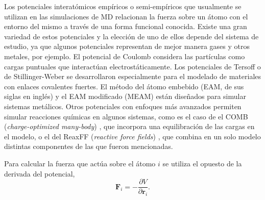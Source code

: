 Los potenciales interatómicos empíricos o semi-empíricos que usualmente se 
utilizan en las simulaciones de MD relacionan la fuerza sobre un átomo con el 
entorno del mismo a través de una forma funcional conocida. Existe una gran 
variedad de estos potenciales y la elección de uno de ellos depende del sistema 
de estudio, ya que algunos potenciales representan de mejor manera gases y otros 
metales, por ejemplo. El potencial de Coulomb \cite{coulomb} considera las 
partículas como cargas puntuales que interactúan electrostáticamente. Los 
potenciales de Tersoff \cite{tersoff} o de Stillinger-Weber 
\cite{stillinger-weber} se desarrollaron especialmente para el modelado de 
materiales con enlaces covalentes fuertes.%
El método del átomo embebido (EAM, de sus siglas en inglés) \cite{eam} 
y el EAM modificado (MEAM) \cite{meam} están diseñados para simular sistemas 
metálicos. Otros potenciales con enfoques más avanzados permiten simular
reacciones químicas en algunos sistemas, como es el caso de el COMB 
(\textit{charge-optimized many-body}) \cite{comb}, que incorpora una 
equilibración de las cargas en el modelo, o el del ReaxFF (\textit{reactive 
force fields}) \cite{reaxff}, que combina en un solo modelo distintas 
componentes de las que fueron mencionadas. 

Para calcular la fuerza que actúa sobre el átomo $i$ se utiliza el opuesto 
de la derivada del potencial,
\begin{equation}\label{eq:fuerzas}
    \mathbf{F}_i = - \frac{\partial V}{\partial \mathbf{r}_i}.
\end{equation}

